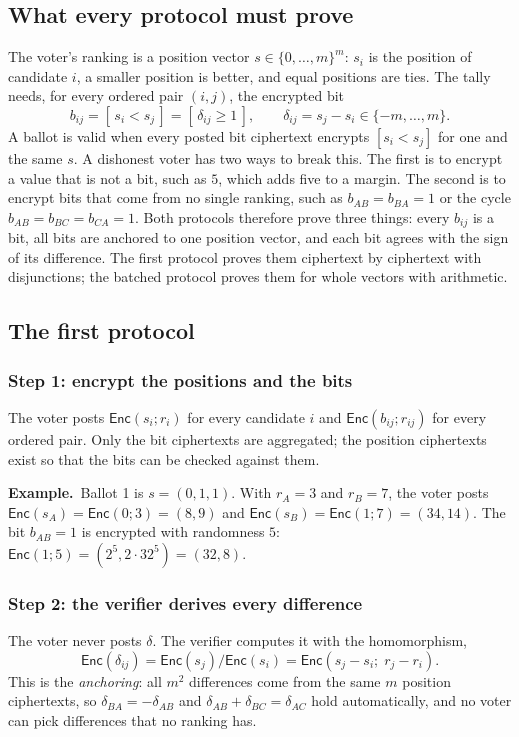 \documentclass[11pt,a4paper]{article}
\newcommand{\Enc}{\mathsf{Enc}}
\newcommand{\ex}[1]{\par\medskip\noindent\textbf{Example.}~#1\par\medskip}
\theoremstyle{remark}
\begin{document}
\subsection{What every protocol must prove}
The voter's ranking is a position vector $s \in \{0, \ldots, m\}^m$: $s_i$
is the position of candidate $i$, a smaller position is better, and equal
positions are ties. The tally needs, for every ordered pair $(i, j)$, the
encrypted bit
\[
  b_{ij} = [\, s_i < s_j \,] = [\, \delta_{ij} \ge 1 \,], \qquad
  \delta_{ij} = s_j - s_i \in \{-m, \ldots, m\}.
\]
A ballot is valid when every posted bit ciphertext encrypts $[s_i < s_j]$
for one and the same $s$. A dishonest voter has two ways to break this.
The first is to encrypt a value that is not a bit, such as $5$, which adds
five to a margin. The second is to encrypt bits that come from no single
ranking, such as $b_{AB} = b_{BA} = 1$ or the cycle $b_{AB} = b_{BC} =
b_{CA} = 1$. Both protocols therefore prove three things: every $b_{ij}$
is a bit, all bits are anchored to one position vector, and each bit
agrees with the sign of its difference. The first protocol proves them
ciphertext by ciphertext with disjunctions; the batched protocol proves
them for whole vectors with arithmetic.

\subsection{The first protocol}

\subsubsection*{Step 1: encrypt the positions and the bits}
The voter posts $\Enc(s_i; r_i)$ for every candidate $i$ and $\Enc(b_{ij};
r_{ij})$ for every ordered pair. Only the bit ciphertexts are aggregated;
the position ciphertexts exist so that the bits can be checked against
them.

\ex{Ballot 1 is $s = (0, 1, 1)$. With $r_A = 3$ and $r_B = 7$, the voter
posts $\Enc(s_A) = \Enc(0; 3) = (8, 9)$ and $\Enc(s_B) = \Enc(1; 7) = (34,
14)$. The bit $b_{AB} = 1$ is encrypted with randomness $5$: $\Enc(1; 5) =
(2^5, 2 \cdot 32^5) = (32, 8)$.}

\subsubsection*{Step 2: the verifier derives every difference}
The voter never posts $\delta$. The verifier computes it with the
homomorphism,
\[
  \Enc(\delta_{ij}) = \Enc(s_j) / \Enc(s_i) = \Enc(s_j - s_i;\; r_j - r_i).
\]
This is the \emph{anchoring}: all $m^2$ differences come from the same $m$
position ciphertexts, so $\delta_{BA} = -\delta_{AB}$ and $\delta_{AB} +
\delta_{BC} = \delta_{AC}$ hold automatically, and no voter can pick
differences that no ranking has.
\end{document}

